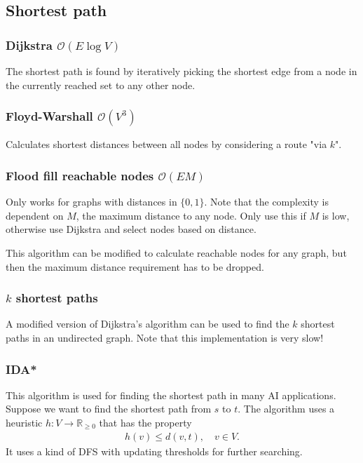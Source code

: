 \subsection{Shortest path}

\subsubsection{Dijkstra $\mathcal O(E\log V)$}
The shortest path is found by iteratively picking the shortest edge from a node in the currently reached set to any other node.

\subsubsection{Floyd-Warshall $\mathcal O(V^3)$}
Calculates shortest distances between all nodes by considering a route "via $k$".

\subsubsection{Flood fill reachable nodes $\mathcal O(EM)$}
Only works for graphs with distances in $\{0, 1\}$. Note that the complexity is dependent on $M$, the maximum distance to any node. Only use this if $M$ is low, otherwise use Dijkstra and select nodes based on distance.

This algorithm can be modified to calculate reachable nodes for any graph, but then the maximum distance requirement has to be dropped.

\subsubsection{$k$ shortest paths}
A modified version of Dijkstra's algorithm can be used to find the $k$ shortest paths in an undirected graph. Note that this implementation is very slow!

\subsubsection{IDA*}
This algorithm is used for finding the shortest path in many AI applications. Suppose we want to find the shortest path from $s$ to $t$. The algorithm uses a heuristic $h: V \to \mathbb R_{\geq 0}$ that has the property
\begin{align*}
    h(v) \leq d(v, t), \quad v \in V.
\end{align*}
It uses a kind of DFS with updating thresholds for further searching.



